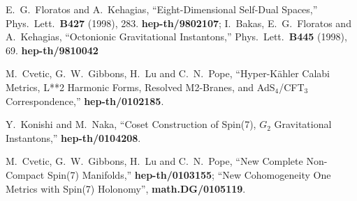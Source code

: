 \documentclass[12pt,a4paper]{article}
\begin{document}
\begin{thebibliography}{99}
 E.~G.~Floratos and A.~Kehagias,
``Eight-Dimensional Self-Dual Spaces,''
Phys.\ Lett.\ {\bf B427} (1998), 283. {\bf hep-th/9802107}; 
I.~Bakas, E.~G.~Floratos and A.~Kehagias,
``Octonionic Gravitational Instantons,''
Phys.\ Lett.\ {\bf B445} (1998), 69. {\bf hep-th/9810042}

 M.~Cvetic, G.~W.~Gibbons, H.~Lu and C.~N.~Pope,
``Hyper-K\"ahler Calabi Metrics, L**2 Harmonic Forms, Resolved M2-Branes, 
and AdS$_4$/CFT$_3$ Correspondence,'' {\bf hep-th/0102185}.

 Y.~Konishi and M.~Naka,
``Coset Construction of Spin(7), $G_2$ Gravitational Instantons,''
{\bf hep-th/0104208}.

 M.~Cvetic, G.~W.~Gibbons, H.~Lu and C.~N.~Pope,
``New Complete Non-Compact Spin(7) Manifolds,'' {\bf hep-th/0103155}; 
``New Cohomogeneity One Metrics with Spin(7) Holonomy'', {\bf math.DG/0105119}.



\end{thebibliography}
\end{document}
